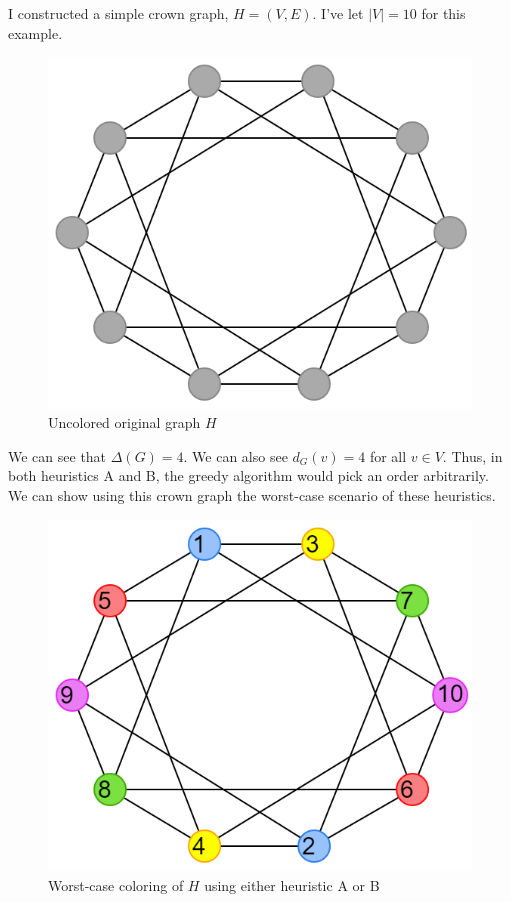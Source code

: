 \documentclass{article}
\theoremstyle{definition}
\begin{document}
I constructed a simple crown graph, \(H = (V, E)\). I've let \(|V| = 10\) for this example.

\begin{figure}[H]
\centering
\includegraphics[scale=0.38]{images/graph-4.png}
\caption{Uncolored original graph \(H\)}
\end{figure}

We can see that \(\Delta(G) = 4\). We can also see \(d_G(v) = 4\) for all \(v \in V\). Thus, in both heuristics A and B, the greedy algorithm would pick an order arbitrarily. We can show using this crown graph the worst-case scenario of these heuristics.

\begin{figure}[H]
\centering
\includegraphics[scale=0.38]{images/graph-5.png}
\caption{Worst-case coloring of \(H\) using either heuristic A or B}
\end{figure}
\end{document}

